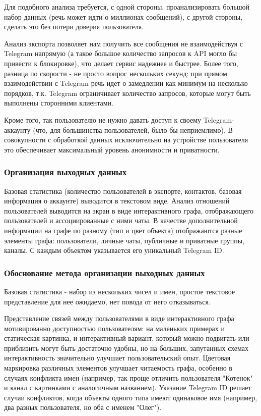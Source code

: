 Для подобного анализа требуется, с одной стороны, проанализировать большой набор данных (речь может идти о миллионах сообщений),
с другой стороны, сделать это без потери доверия пользователя.

Анализ экспорта позволяет нам получить все сообщения не взаимодействуя с Telegram напрямую (а такое большое количество запросов к API могло бы привести к блокировке), что делает сервис надежнее и быстрее.
Более того, разница по скорости - не просто вопрос нескольких секунд: при прямом взаимодействии с Telegram речь идет о замедлении как минимум на несколько порядков, т.к. Telegram ограничивает количество запросов, которые могут быть выполнены сторонними клиентами.

Кроме того, так пользователю не нужно давать доступ к своему Telegram-аккаунту (что, для большинства пользователей, было бы неприемлимо). 
В совокупности с обработкой данных исключительно на устройстве пользователя это обеспечивает максимальный уровень анонимности и приватности.

\subsubsection{Организация выходных данных}

Базовая статистика (количество пользователей в экспорте, контактов, базовая информация о аккаунте) выводится в текстовом виде.
Анализ отношений пользователей выводится на экран в виде интерактивного графа, отображающего пользователей и ассоциированные с ними чаты.
В качестве дополнительной информации на графе по разному (тип и цвет объекта) отображаются разные элементы графа: пользователи, личные чаты, публичные и приватные группы, каналы.
С каждым объектом указывается его уникальный Telegram ID.

\subsubsection{Обоснование метода организации выходных данных}

Базовая статистика - набор из нескольких чисел и имен, простое текстовое представление для нее ожидаемо, нет повода от него отказываться.

Представление связей между пользователями в виде интерактивного графа мотивированно доступностью пользователям: на маленьких примерах и статическая картинка, и интерактивный вариант, который можно подвигать или приблизить могут быть достаточно удобны, но на больших, запутанных схемах интерактивность значительно улучшает пользовательский опыт.
Цветовая маркировка различных элементов улучшает читаемость графа, особенно в случаях конфликта имен (например, так проще отличить пользователя "Котенок" и канал с картинками с аналогичным названием).
Указание Telegram ID решает случаи конфликтов, когда объекты одного типа имеют одинаковое имя (например, два разных пользователя, но оба с именем "Олег").